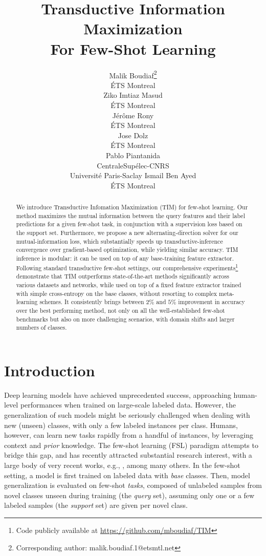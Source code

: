 \documentclass{article}
\title{Transductive Information Maximization \\ For Few-Shot Learning}
\author{Malik Boudiaf\thanks{Corresponding author: malik.boudiaf.1@etsmtl.net} \\
  \'ETS Montreal \\
\And
  Ziko Imtiaz Masud \\
  \'ETS Montreal \\
  \And
  Jérôme Rony \\
  \'ETS Montreal \\
  \AND
  Jose Dolz \\
  \'ETS Montreal \\
  \And
  Pablo Piantanida \\
  CentraleSup\'elec-CNRS \\ Universit\'e Paris-Saclay 
  \And
  Ismail Ben Ayed \\
  \'ETS Montreal \\
}
\begin{document}
\maketitle
\begin{abstract}


We introduce Transductive Infomation Maximization (TIM) for few-shot learning. Our method maximizes the mutual information between the query features and their label predictions for a given few-shot task, in conjunction with a supervision loss based on the support set. Furthermore, we propose a new alternating-direction solver for our mutual-information loss, which substantially speeds up transductive-inference convergence over gradient-based optimization, while yielding similar accuracy. 
TIM inference is modular: it can be used on top of any base-training feature extractor. 
Following standard transductive few-shot settings, our comprehensive experiments\footnote{Code publicly available at \url{https://github.com/mboudiaf/TIM}} demonstrate that TIM outperforms state-of-the-art methods significantly across various datasets and networks, while used on top of a fixed feature extractor trained with simple cross-entropy on the base classes, without resorting to complex meta-learning schemes. It consistently brings between $2 \%$ and $5 \%$ improvement in accuracy over the best performing method, not only on all the well-established few-shot benchmarks but also on more challenging scenarios, with domain shifts and larger numbers of classes.


\end{abstract} 
\section{Introduction}
    Deep learning models have achieved unprecedented success, approaching human-level performances when trained on large-scale labeled data. However, the generalization of such models might be seriously challenged when dealing with new (unseen) classes, with only a few labeled instances per class. Humans, however, can learn new tasks rapidly from a handful of instances, by leveraging context and \emph{prior} knowledge. The few-shot learning (FSL) paradigm \cite{miller2000learning,fei2006one,matching_net} attempts to bridge this gap, and has recently attracted substantial research interest, with a large body of very recent works, e.g., \cite{can,dhillon2019baseline,leo,feat,liu2018learning,closer_look,team,kim2019edge,relation_net,inat_benchmark,gidaris2019boosting,prototypical_nets,maml}, among many others. In the few-shot setting, a model is first trained on labeled data with {\em base} classes. Then, model generalization is evaluated on few-shot {\em tasks}, composed of unlabeled samples from novel classes unseen during training (the {\em query} set), assuming only one or a few labeled samples (the {\em support} set) are given per novel class. 
    
\end{document}
